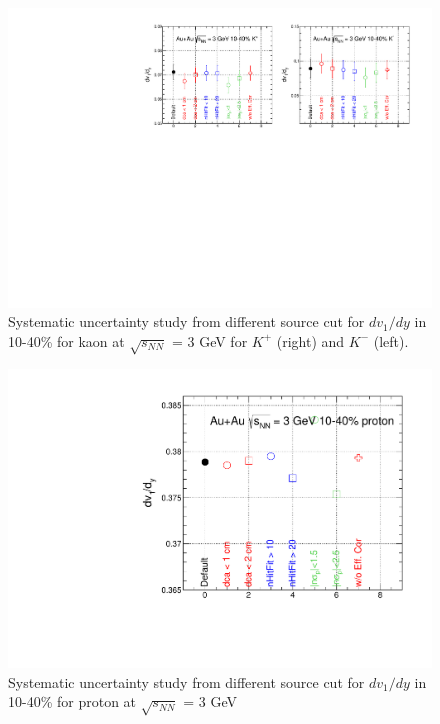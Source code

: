 \begin{figure}[h]
\includegraphics[scale=0.8]{FXT3gev/chapter3/fig/sys/kaon/dv1y_kaon_sys.pdf}
\caption{Systematic uncertainty study from different source cut for $dv_{1}/dy$ in 10-40\% for kaon at $\sqrt{s_{NN}}$ = 3 GeV for $K^{+}$ (right) and $K^{-}$ (left).}
\label{fig:kaon_dv1y_sys}
\end{figure}

\begin{figure}
    \centering
    \includegraphics[scale=0.5]{FXT3gev/chapter3/fig/sys/proton/dv1y_proton_sys.pdf}
    \caption{Systematic uncertainty study from different source cut for $dv_{1}/dy$ in 10-40\% for proton at $\sqrt{s_{NN}}$ = 3 GeV}
    \label{fig:proton_dv1_sys}
\end{figure}

